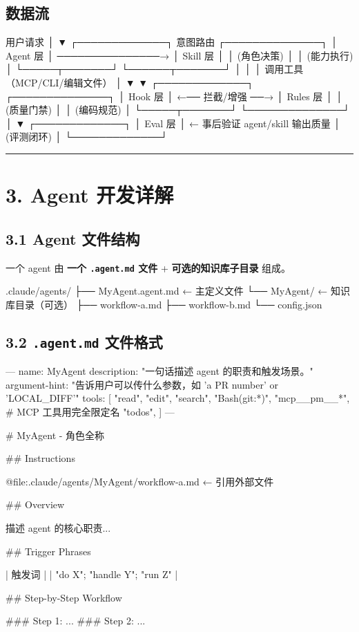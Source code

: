\subsection{数据流}

\begin{codeblock}
用户请求
    │
    ▼
┌─────────────┐     意图路由      ┌──────────────┐
│  Agent 层   │ ───────────────→ │  Skill 层    │
│  (角色决策) │                   │  (能力执行)  │
└─────┬───────┘                   └──────┬───────┘
      │                                  │
      │  调用工具（MCP/CLI/编辑文件）      │
      ▼                                  ▼
┌─────────────┐                   ┌──────────────┐
│  Hook 层    │ ←── 拦截/增强 ──→ │  Rules 层    │
│  (质量门禁) │                   │  (编码规范)  │
└─────┬───────┘                   └──────────────┘
      │
      ▼
┌─────────────┐
│  Eval 层    │  ← 事后验证 agent/skill 输出质量
│  (评测闭环) │
└─────────────┘
\end{codeblock}

\bigskip\hrule\bigskip

\section{3. Agent 开发详解}

\subsection{3.1 Agent 文件结构}

一个 agent 由 \textbf{一个 \texttt{.agent.md} 文件} + \textbf{可选的知识库子目录} 组成。


\begin{codeblock}
.claude/agents/
├── MyAgent.agent.md          ← 主定义文件
└── MyAgent/                  ← 知识库目录（可选）
    ├── workflow-a.md
    ├── workflow-b.md
    └── config.json
\end{codeblock}

\subsection{3.2 \texttt{.agent.md} 文件格式}

\begin{codeblock}
---
name: MyAgent
description: "一句话描述 agent 的职责和触发场景。"
argument-hint: "告诉用户可以传什么参数，如 'a PR number' or 'LOCAL_DIFF'"
tools:
  [
    "read",
    "edit",
    "search",
    "Bash(git:*)",
    "mcp__pm__*",          # MCP 工具用完全限定名
    "todos",
  ]
---

# MyAgent - 角色全称

## Instructions

@file:.claude/agents/MyAgent/workflow-a.md    ← 引用外部文件

## Overview

描述 agent 的核心职责...

## Trigger Phrases

| 触发词 |
| "do X"; "handle Y"; "run Z" |

## Step-by-Step Workflow

### Step 1: ...
### Step 2: ...
\end{codeblock}


